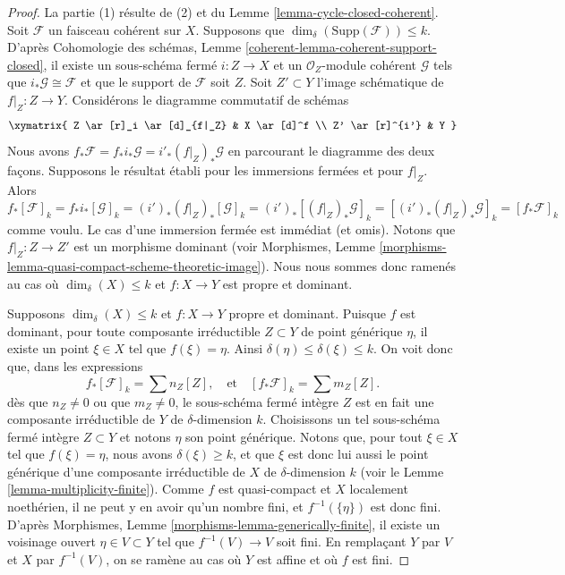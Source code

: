\begin{proof}
La partie (1) résulte de (2) et du Lemme \ref{lemma-cycle-closed-coherent}.
Soit $\mathcal{F}$ un faisceau cohérent sur $X$.
Supposons que $\dim_\delta(\text{Supp}(\mathcal{F})) \leq k$.
D'après Cohomologie des schémas, Lemme \ref{coherent-lemma-coherent-support-closed},
il existe un sous-schéma fermé $i : Z \to X$ et un
$\mathcal{O}_Z$-module cohérent $\mathcal{G}$ tels que
$i_*\mathcal{G} \cong \mathcal{F}$ et que le support
de $\mathcal{F}$ soit $Z$. Soit $Z' \subset Y$ l'image schématique
de $f|_Z : Z \to Y$. Considérons le diagramme commutatif de schémas
$$
\xymatrix{
Z \ar[r]_i \ar[d]_{f|_Z} &
X \ar[d]^f \\
Z' \ar[r]^{i'} & Y
}
$$
Nous avons $f_*\mathcal{F} = f_*i_*\mathcal{G} = i'_*(f|_Z)_*\mathcal{G}$
en parcourant le diagramme des deux façons. Supposons le résultat établi
pour les immersions fermées et pour $f|_Z$. Alors
$$
f_*[\mathcal{F}]_k = f_*i_*[\mathcal{G}]_k
= (i')_*(f|_Z)_*[\mathcal{G}]_k =
(i')_*[(f|_Z)_*\mathcal{G}]_k =
[(i')_*(f|_Z)_*\mathcal{G}]_k = [f_*\mathcal{F}]_k
$$
comme voulu. Le cas d'une immersion fermée est immédiat (et omis).
Notons que $f|_Z : Z \to Z'$ est un morphisme dominant (voir
Morphismes, Lemme \ref{morphisms-lemma-quasi-compact-scheme-theoretic-image}).
Nous nous sommes donc ramenés au cas où
$\dim_\delta(X) \leq k$ et $f : X \to Y$ est propre et dominant.

\medskip\noindent
Supposons $\dim_\delta(X) \leq k$ et $f : X \to Y$ propre et dominant.
Puisque $f$ est dominant, pour toute composante irréductible $Z \subset Y$
de point générique $\eta$, il existe un point $\xi \in X$ tel
que $f(\xi) = \eta$. Ainsi $\delta(\eta) \leq \delta(\xi) \leq k$.
On voit donc que, dans les expressions
$$
f_*[\mathcal{F}]_k = \sum n_Z[Z],
\quad
\text{et}
\quad
[f_*\mathcal{F}]_k = \sum m_Z[Z].
$$
dès que $n_Z \not = 0$ ou que $m_Z \not = 0$, le sous-schéma fermé
intègre $Z$ est en fait une composante irréductible de $Y$ de
$\delta$-dimension $k$. Choisissons un tel sous-schéma fermé intègre
$Z \subset Y$ et notons $\eta$ son point générique. Notons que, pour
tout $\xi \in X$ tel que $f(\xi) = \eta$, nous avons $\delta(\xi) \geq k$,
et que $\xi$ est donc lui aussi le point générique d'une composante irréductible
de $X$ de $\delta$-dimension $k$
(voir le Lemme \ref{lemma-multiplicity-finite}). Comme $f$ est quasi-compact
et $X$ localement noethérien, il ne peut y en avoir qu'un nombre fini,
et $f^{-1}(\{\eta\})$ est donc fini.
D'après Morphismes, Lemme \ref{morphisms-lemma-generically-finite}, il existe
un voisinage ouvert $\eta \in V \subset Y$ tel que $f^{-1}(V) \to V$
soit fini. En remplaçant $Y$ par $V$ et $X$ par $f^{-1}(V)$, on se ramène au
cas où $Y$ est affine et où $f$ est fini.


\end{proof}
